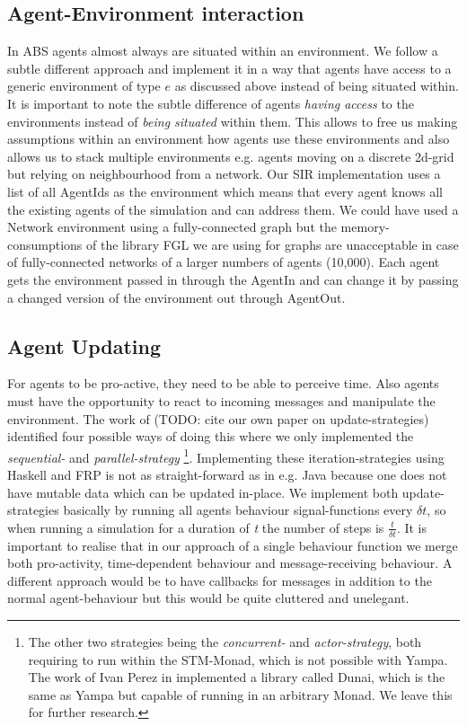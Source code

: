 \subsection{Agent-Environment interaction}
In ABS agents almost always are situated within an environment. We follow a subtle different approach and implement it in a way that agents have access to a generic environment of type $e$ as discussed above instead of being situated within. It is important to note the subtle difference of agents \textit{having access} to the environments instead of \textit{being situated} within them. This allows to free us making assumptions within an environment how agents use these environments and also allows us to stack multiple environments e.g. agents moving on a discrete 2d-grid but relying on neighbourhood from a network.
Our SIR implementation uses a list of all AgentIds as the environment which means that every agent knows all the existing agents of the simulation and can address them. We could have used a Network environment using a fully-connected graph but the memory-consumptions of the library FGL we are using for graphs are unacceptable in case of fully-connected networks of a larger numbers of agents (10,000).
Each agent gets the environment passed in through the AgentIn and can change it by passing a changed version of the environment out through AgentOut. 

\subsection{Agent Updating}
For agents to be pro-active, they need to be able to perceive time. Also agents must have the opportunity to react to incoming messages and manipulate the environment. The work of (TODO: cite our own paper on update-strategies) identified four possible ways of doing this where we only implemented the \textit{sequential-} and \textit{parallel-strategy} \footnote{The other two strategies being the  \textit{concurrent-} and \textit{actor-strategy}, both requiring to run within the STM-Monad, which is not possible with Yampa. The work of Ivan Perez in \cite{perez_functional_2016} implemented a library called Dunai, which is the same as Yampa but capable of running in an arbitrary Monad. We leave this for further research.}. Implementing these iteration-strategies using Haskell and FRP is not as straight-forward as in e.g. Java because one does not have mutable data which can be updated in-place. 
We implement both update-strategies basically by running all agents behaviour signal-functions every $\delta t$, so when running a simulation for a duration of \textit{t} the number of steps is $\frac{t}{\delta t}$. It is important to realise that in our approach of a single behaviour function we merge both pro-activity, time-dependent behaviour and message-receiving behaviour. A different approach would be to have callbacks for messages in addition to the normal agent-behaviour but this would be quite cluttered and unelegant.

